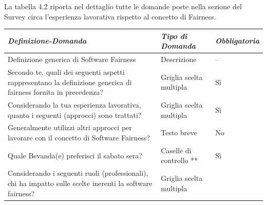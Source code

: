    La tabella 4.2 riporta nel dettaglio tutte le domande poste nella sezione del Survey circa l'esperienza lavorativa rispetto al concetto di Fairness.
   
   \begin{longtable}{| p{} | p{} | p{} |} 
        \hline\textbf{\textit{Definizione-Domanda}} & \textbf{\textit{Tipo di Domanda}} & \textbf{\textit{Obbligatoria}}\\
        \hline
        \endhead 
        
        \hline 
         Definizione generica di Software Fairness
        
        & Descrizione
        
        & --
        
        \\ \hline
        \rowcolor{Gray}
        Secondo te, quali dei seguenti aspetti rappresentano la definizione generica di fairness fornita in precedenza?
        
        &  Griglia scelta multipla
        
        & Sì
        
        \\ \hline
        
         Considerando la tua esperienza lavorativa, quanto i seguenti (approcci) sono trattati?
        
        & Griglia scelta multipla
        
        & Sì
        
        \\ \hline
        \rowcolor{Gray}
        Generalmente utilizzi altri approcci per lavorare con il concetto di Software Fairness?        
        
        &  Testo breve
        
        & No
        
        \\ 
        \hline 
         Quale Bevanda(e) preferisci il sabato sera?
        
        & Caselle di controllo **
        
        & Sì
        
        \\ \hline
        
        \rowcolor{Gray}
         Considerando i seguenti ruoli (professionali), chi ha impatto sulle scelte inerenti la software fairness?
        
        & Griglia scelta multipla 
        

\end{longtable}

